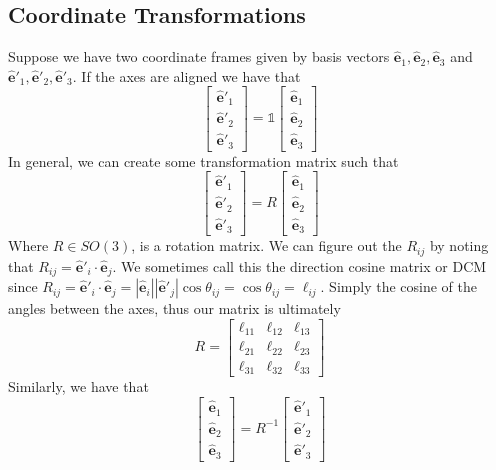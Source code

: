 \documentclass[a4paper]{article}
\begin{document}
\subsection*{Coordinate Transformations}
Suppose we have two coordinate frames given by basis vectors $\hat{\mathbf{e}}_1, \hat{\mathbf{e}}_2, \hat{\mathbf{e}}_3$ and $\hat{\mathbf{e}}'_1, \hat{\mathbf{e}}'_2, \hat{\mathbf{e}}'_3$. If the axes are aligned we have that
\[
    \begin{bmatrix}
        \hat{\mathbf{e}}'_1 \\
        \hat{\mathbf{e}}'_2 \\
        \hat{\mathbf{e}}'_3
    \end{bmatrix}
    = \mathds{1}
    \begin{bmatrix}
        \hat{\mathbf{e}}_1 \\
        \hat{\mathbf{e}}_2 \\
        \hat{\mathbf{e}}_3
    \end{bmatrix}
\]
In general, we can create some transformation matrix such that
\[
    \begin{bmatrix}
        \hat{\mathbf{e}}'_1 \\
        \hat{\mathbf{e}}'_2 \\
        \hat{\mathbf{e}}'_3
    \end{bmatrix}
    = R
    \begin{bmatrix}
        \hat{\mathbf{e}}_1 \\
        \hat{\mathbf{e}}_2 \\
        \hat{\mathbf{e}}_3
    \end{bmatrix}
\]
Where $R \in SO(3)$, is a rotation matrix. We can figure out the $R_{ij}$ by noting that
$R_{ij} = \hat{\mathbf{e}}'_i \cdot \hat{\mathbf{e}}_j$. We sometimes call this the direction cosine matrix or DCM since $R_{ij} = \hat{\mathbf{e}}'_i \cdot \hat{\mathbf{e}}_j = |\hat{\mathbf{e}}_i||\hat{\mathbf{e}}'_j|\cos \theta_{ij} = \cos \theta_{ij} = \ell_{ij}$. Simply the cosine of the angles between the axes, thus our matrix is ultimately
\[
    R = 
    \begin{bmatrix}
        \ell_{11} & \ell_{12} & \ell_{13} \\
        \ell_{21} & \ell_{22} & \ell_{23} \\
        \ell_{31} & \ell_{32} & \ell_{33}
    \end{bmatrix}
\]
Similarly, we have that
\[
    \begin{bmatrix}
        \hat{\mathbf{e}}_1 \\
        \hat{\mathbf{e}}_2 \\
        \hat{\mathbf{e}}_3
    \end{bmatrix}
    = R^{-1}
    \begin{bmatrix}
        \hat{\mathbf{e}}'_1 \\
        \hat{\mathbf{e}}'_2 \\
        \hat{\mathbf{e}}'_3
    \end{bmatrix}
\]
\end{document}
